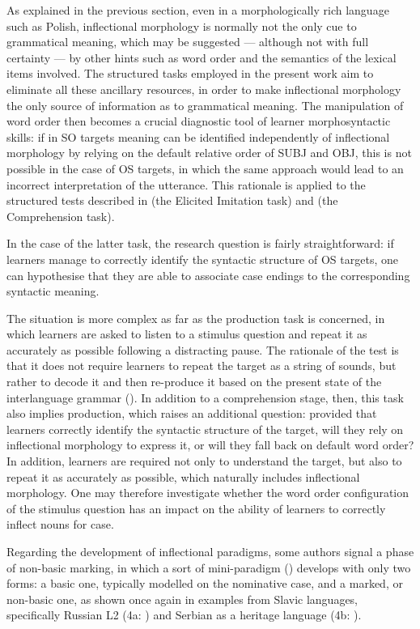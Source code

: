 As explained in the previous section, even in a morphologically rich language such as Polish, inflectional morphology is normally not the only cue to grammatical meaning, which may be suggested — although not with full certainty — by other hints such as word order and the semantics of the lexical items involved. The structured tasks employed in the present work aim to eliminate all these ancillary resources, in order to make inflectional morphology the only source of information as to grammatical meaning. The manipulation of word order then becomes a crucial diagnostic tool of learner morphosyntactic skills: if in SO targets meaning can be identified independently of inflectional morphology by relying on the default relative order of SUBJ and OBJ, this is not possible in the case of OS targets, in which the same approach would lead to an incorrect interpretation of the utterance. This rationale is applied to the structured tests described in  (the Elicited Imitation task) and  (the Comprehension task).

In the case of the latter task, the research question is fairly straightforward: if learners manage to correctly identify the syntactic structure of OS targets, one can hypothesise that they are able to associate case endings to the corresponding syntactic meaning.

The situation is more complex as far as the production task is concerned, in which learners are asked to listen to a stimulus question and repeat it as accurately as possible following a distracting pause. The rationale of the test is that it does not require learners to repeat the target as a string of sounds, but rather to decode it and then re-produce it based on the present state of the interlanguage grammar (). In addition to a comprehension stage, then, this task also implies production, which raises an additional question: provided that learners correctly identify the syntactic structure of the target, will they rely on inflectional morphology to express it, or will they fall back on default word order? In addition, learners are required not only to understand the target, but also to repeat it as accurately as possible, which naturally includes inflectional morphology. One may therefore investigate whether the word order configuration of the stimulus question has an impact on the ability of learners to correctly inflect nouns for case.

Regarding the development of inflectional paradigms, some authors signal a phase of non-basic marking, in which a sort of mini-paradigm (\citealt{BittnerEtAl2000}) develops with only two forms: a basic one, typically modelled on the nominative case, and a marked, or non-basic one, as shown once again in examples from Slavic languages, specifically Russian L2 (4a: \citealt[188]{ArtoniMagnani2015}) and Serbian as a heritage language (4b: \citealt{Di-BiaseBettoni2015}). 

